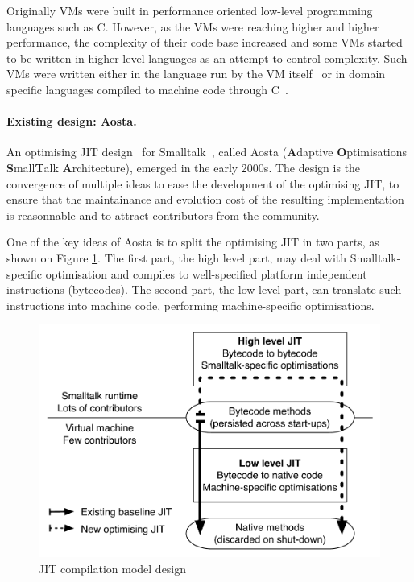\documentclass[a4paper,12pt,twoside]{../includes/ThesisStyle}
\begin{document}
Originally VMs were built in performance oriented low-level programming languages such as C. However, as the VMs were reaching higher and higher performance, the complexity of their code base increased and some VMs started to be written in higher-level languages as an attempt to control complexity. Such VMs were written either in the language run by the VM itself~\cite{Unga05b,Wimm13a,Alp99a} or in domain specific languages compiled to machine code through C~\cite{Rigo06a,Inga97a}.

\paragraph{Existing design: Aosta.}

An optimising JIT design~\cite{Mira02c} for Smalltalk~\cite{Gold83a}, called Aosta (\textbf{A}daptive \textbf{O}ptimisations \textbf{S}mall\textbf{T}alk \textbf{A}rchitecture), emerged in the early 2000s. The design is the convergence of multiple ideas to ease the development of the optimising JIT, to ensure that the maintainance and evolution cost of the resulting implementation is reasonnable and to attract contributors from the community.

One of the key ideas of Aosta is to split the optimising JIT in two parts, as shown on Figure \ref{fig:ExistingDesign}. The first part, the high level part, may deal with Smalltalk-specific optimisation and compiles to well-specified platform independent instructions (bytecodes). The second part, the low-level part, can translate such instructions into machine code, performing machine-specific optimisations.

\begin{figure}[h!]
    \begin{center}
        \includegraphics[width=0.8\linewidth]{ExistingDesign}
        \caption{JIT compilation model design}
        \label{fig:ExistingDesign}
    \end{center}
\end{figure}
\end{document}
